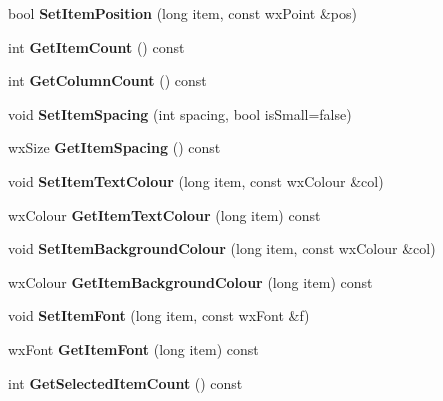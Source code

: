 \begin{DoxyCompactItemize}
\item 
bool {\bfseries SetItemPosition} (long item, const wxPoint \&pos)\label{classMuleExtern_1_1wxGenericListCtrl_add9bc5004aa5bfe1206027148e2a0a70}

\item 
int {\bfseries GetItemCount} () const \label{classMuleExtern_1_1wxGenericListCtrl_acacce60fff154ecad3e95654a16b1e72}

\item 
int {\bfseries GetColumnCount} () const \label{classMuleExtern_1_1wxGenericListCtrl_a77c6976d2d4606067468b618de9b82f2}

\item 
void {\bfseries SetItemSpacing} (int spacing, bool isSmall=false)\label{classMuleExtern_1_1wxGenericListCtrl_a6fc5f15486c88e532418068e7ad700d5}

\item 
wxSize {\bfseries GetItemSpacing} () const \label{classMuleExtern_1_1wxGenericListCtrl_af8b13d795c9cf478dd43d79e9d1e256e}

\item 
void {\bfseries SetItemTextColour} (long item, const wxColour \&col)\label{classMuleExtern_1_1wxGenericListCtrl_a3f311a949df71a303d662b4aa11cfc49}

\item 
wxColour {\bfseries GetItemTextColour} (long item) const \label{classMuleExtern_1_1wxGenericListCtrl_a8b58fa2909c9fd1839e896f84b93b265}

\item 
void {\bfseries SetItemBackgroundColour} (long item, const wxColour \&col)\label{classMuleExtern_1_1wxGenericListCtrl_ade3c7a54a90dabc2c18731ecb37993cb}

\item 
wxColour {\bfseries GetItemBackgroundColour} (long item) const \label{classMuleExtern_1_1wxGenericListCtrl_a7560d6b33804b46111e81072a69814ae}

\item 
void {\bfseries SetItemFont} (long item, const wxFont \&f)\label{classMuleExtern_1_1wxGenericListCtrl_aaf9963bb3e46b6f5d3ef615fab22b29a}

\item 
wxFont {\bfseries GetItemFont} (long item) const \label{classMuleExtern_1_1wxGenericListCtrl_a656fb12af5f002296cc0f920f74da262}

\item 
int {\bfseries GetSelectedItemCount} () const \label{classMuleExtern_1_1wxGenericListCtrl_a6f36163871b712382933f7293e069170}


\end{DoxyCompactItemize}
